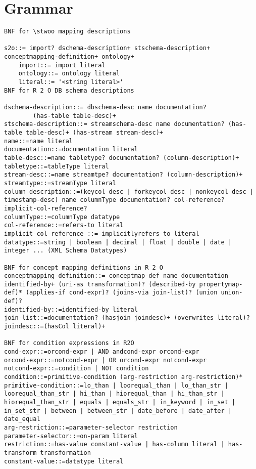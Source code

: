 \section{\bigstwoo Grammar}
\label{sec:appendixStwoo}

\begin{lstlisting}[style=BNFStyle,language=BNF,label=list:schema,caption=Grammar of the \stwoo mapping language.]
BNF for \stwoo mapping descriptions

s2o::= import? dschema-description+ stschema-description+ conceptmapping-definition+ ontology+
	import::= import literal
	ontology::= ontology literal
	literal::= '<string literal>'
BNF for R 2 O DB schema descriptions

dschema-description::= dbschema-desc name documentation?
		(has-table table-desc)+ 
stschema-description::= streamschema-desc name documentation? (has-table table-desc)+ (has-stream stream-desc)+
name::=name literal
documentation::=documentation literal
table-desc::=name tabletype? documentation? (column-description)+
tabletype::=tableType literal
stream-desc::=name streamtpe? documentation? (column-description)+
streamtype::=streamType literal
column-description::=(keycol-desc | forkeycol-desc | nonkeycol-desc | timestamp-desc) name columnType documentation? col-reference? implicit-col-reference?
columnType::=columnType datatype
col-reference::=refers-to literal
implicit-col-reference ::= implicitlyrefers-to literal
datatype::=string | boolean | decimal | float | double | date | integer ... (XML Schema Datatypes)

BNF for concept mapping definitions in R 2 O
conceptmapping-definition::= conceptmap-def name documentation identified-by+ (uri-as transformation)? (described-by propertymap-def)* (applies-if cond-expr)? (joins-via join-list)? (union union-def)?
identified-by::=identified-by literal
join-list::=documentation? (hasjoin joindesc)+ (overwrites literal)?
joindesc::=(hasCol literal)+

BNF for condition expressions in R2O
cond-expr::=orcond-expr | AND andcond-expr orcond-expr
orcond-expr::=notcond-expr | OR orcond-expr notcond-expr
notcond-expr::=condition | NOT condition
condition::=primitive-condition (arg-restriction arg-restriction)*
primitive-condition::=lo_than | loorequal_than | lo_than_str | loorequal_than_str | hi_than | hiorequal_than | hi_than_str | hiorequal_than_str | equals | equals_str | in_keyword | in_set | in_set_str | between | between_str | date_before | date_after | date_equal
arg-restriction::=parameter-selector restriction
parameter-selector::=on-param literal
restriction::=has-value constant-value | has-column literal | has-transform transformation 
constant-value::=datatype literal


\end{lstlisting}
